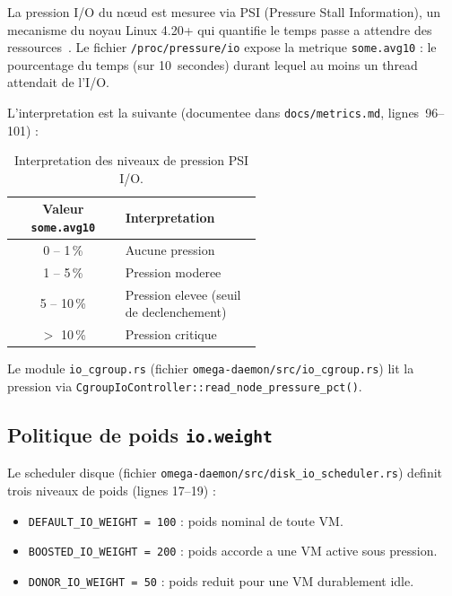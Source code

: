 La pression I/O du n\oe{}ud est mesuree via PSI (Pressure Stall Information), un mecanisme du noyau Linux 4.20+ qui quantifie le temps passe a attendre des ressources~\cite{psi_doc}. Le fichier \texttt{/proc/pressure/io} expose la metrique \texttt{some.avg10} : le pourcentage du temps (sur 10~secondes) durant lequel au moins un thread attendait de l'I/O.

L'interpretation est la suivante (documentee dans \texttt{docs/metrics.md}, lignes~96--101) :

\begin{table}[htbp]
    \centering
    \caption{Interpretation des niveaux de pression PSI I/O.}
    \label{tab:psi-interpretation}
    \begin{tabular}{c p{0.55\linewidth}}
        \toprule
        \textbf{Valeur \texttt{some.avg10}} & \textbf{Interpretation} \\
        \midrule
        0 -- 1\,\% & Aucune pression \\
        1 -- 5\,\% & Pression moderee \\
        5 -- 10\,\% & Pression elevee (seuil de declenchement) \\
        $>$ 10\,\% & Pression critique \\
        \bottomrule
    \end{tabular}
\end{table}

Le module \texttt{io\_cgroup.rs} (fichier \texttt{omega-daemon/src/io\_cgroup.rs}) lit la pression via \texttt{CgroupIoController::read\_node\_pressure\_pct()}.

\subsection{Politique de poids \texttt{io.weight}}
\label{subsec:io-weight}

Le scheduler disque (fichier \texttt{omega-daemon/src/disk\_io\_scheduler.rs}) definit trois niveaux de poids (lignes 17--19) :

\begin{itemize}
    \item \texttt{DEFAULT\_IO\_WEIGHT = 100} : poids nominal de toute VM.
    \item \texttt{BOOSTED\_IO\_WEIGHT = 200} : poids accorde a une VM active sous pression.
    \item \texttt{DONOR\_IO\_WEIGHT = 50} : poids reduit pour une VM durablement idle.
\end{itemize}

